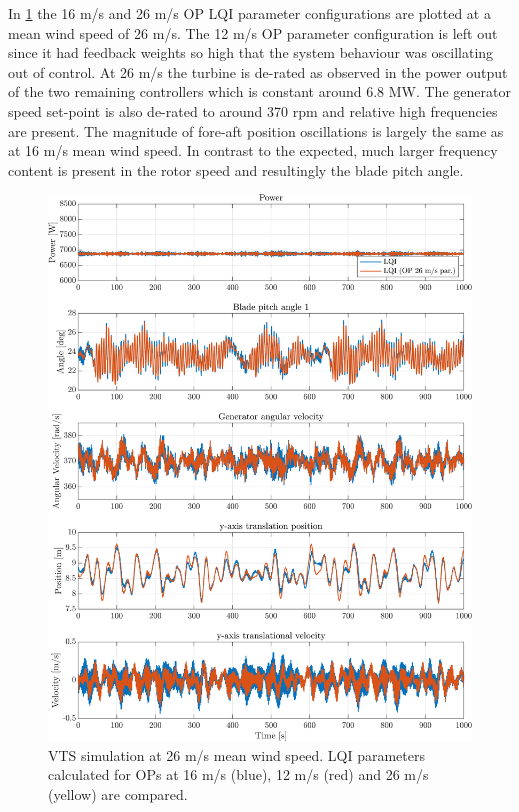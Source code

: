 \clearpage\newpage
In \cref{fig:vts_30_pow_th_w_py_vy} the 16 m/s and 26 m/s OP LQI parameter configurations are plotted at a mean wind speed of 26 m/s. The 12 m/s OP parameter configuration is left out since it had feedback weights so high that the system behaviour was oscillating out of control. At 26 m/s the turbine is de-rated as observed in the power output of the two remaining controllers which is constant around 6.8 MW. The generator speed set-point is also de-rated to around 370 rpm and relative high frequencies are present. The magnitude of fore-aft position oscillations is largely the same as at 16 m/s mean wind speed. In contrast to the expected, much larger frequency content is present in the rotor speed and resultingly the blade pitch angle.
\begin{figure}[h]
	\centering
	\includegraphics[width=0.7\linewidth]{Graphics/TestResults/VTSplotting/30_pow_th_w_py_vy.png}
	\caption{VTS simulation at 26 m/s mean wind speed. LQI parameters calculated for OPs at 16 m/s (blue), 12 m/s (red) and 26 m/s (yellow) are compared.}
	\label{fig:vts_30_pow_th_w_py_vy}
\end{figure}


